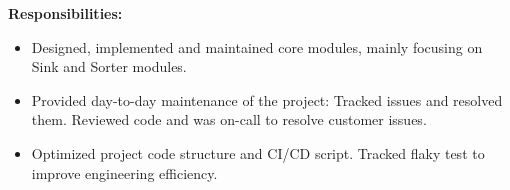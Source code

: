 \documentclass{resume}
\newcommand{\en}[1]{#1}
\newcommand{\zh}[1]{}
\begin{document}
\en{\textbf{Responsibilities:}}
\zh{\textbf{职责：}}
\begin{itemize}
      \item \en{Designed, implemented and maintained core modules, mainly focusing on Sink and Sorter modules.}
            \zh{设计、实现和维护核心模块，主要聚焦于 Sink 和 Sorter 模块。}
      \item \en{Provided day-to-day maintenance of the project: Tracked issues and resolved them. Reviewed code and was on-call to resolve customer issues.}
            \zh{项目日常的维护：Issues 追踪和解决、代码审阅和 on-call 解决客户问题。}
      \item \en{Optimized project code structure and CI/CD script. Tracked flaky test to improve engineering efficiency.}
            \zh{优化项目代码结构、追踪不稳定测试，优化 CI/CD 脚本，提升工程效率。}
\end{itemize}
\end{document}
